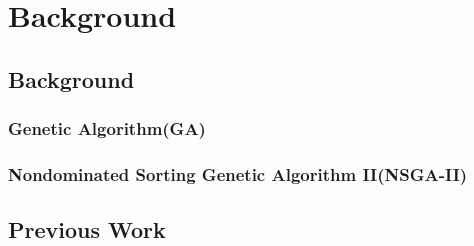 \chapter{Background}
\label{chap:background}

\section{Background}

\subsection{Genetic Algorithm(GA)}


\subsection{Nondominated Sorting Genetic Algorithm II(NSGA-II)}


\section{Previous Work}

